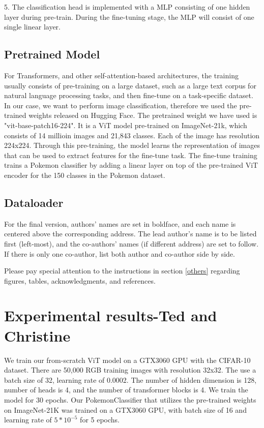 \documentclass{article} %
\begin{document}
5. The classification head is implemented with a MLP consisting of one hidden layer during pre-train.
During the fine-tuning stage, the MLP will consist of one single linear layer.



\subsection{Pretrained Model}
For Transformers, and other self-attention-based architectures, the training usually consists of pre-training on 
a large dataset, such as a large text corpus for natural language processing tasks, and then fine-tune on a 
task-specific dataset. In our case, we want to perform image classification, therefore we used the pre-trained weights
released on Hugging Face. The pretrained weight we have used is "vit-base-patch16-224". It is a ViT model pre-trained
on ImageNet-21k, which consists of 14 millioin images and 21,843 classes. Each of the image has resolution 224x224.
Through this pre-training, the model learns the representation of images that can be used to extract features for the
fine-tune task. The fine-tune training trains a Pokemon classifier by adding a linear layer on top of the pre-trained
ViT encoder for the 150 classes in the Pokemon dataset.

\subsection{Dataloader} %


For the final version, authors' names are
set in boldface, and each name is centered above the corresponding
address. The lead author's name is to be listed first (left-most), and
the co-authors' names (if different address) are set to follow. If
there is only one co-author, list both author and co-author side by side.

Please pay special attention to the instructions in section \ref{others}
regarding figures, tables, acknowledgments, and references.

\section{Experimental results-Ted and Christine}
\label{headings}
We train our from-scratch ViT model on a GTX3060 GPU with the CIFAR-10 dataset. There are 50,000 RGB training images
with resolution 32x32. The use a batch size of 32, learning rate of 0.0002. The number of hidden dimension is 128,
number of heads is 4, and the number of transformer blocks is 4. We train the model for 30 epochs. Our PokemonClassifier
that utilizes the pre-trained weights on ImageNet-21K was trained on a GTX3060 GPU, with batch size of 16 and learning 
rate of $5 * 10^{-5}$ for 5 epochs. 
\end{document}

